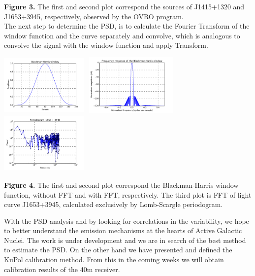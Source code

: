 \documentclass[a0paper,portrait]{baposter}
\begin{document}
\begin{poster}
{\begin{center}
\end{center}
\small{\textbf{Figure 3.} The first and second plot correspond the sources of J1415+1320 and J1653+3945, respectively, observed by the OVRO program.}\\
The next step to determine the PSD, is to calculate the Fourier Transform of the window function and the curve separately and convolve, which is analogous to convolve the signal with the window function and apply Transform.
\begin{center}
\includegraphics [height=30mm, width=43mm] {BH.pdf}
\hspace{.3cm}
\includegraphics [height=30mm, width=48mm] {FFTBH.pdf}
\hspace{.3cm}
\includegraphics [height=30mm, width=43mm] {FFTcurva_2.pdf}
\end{center}
\small{\textbf{Figure 4.} The first and second plot correspond the  Blackman-Harris window function, without FFT and with FFT, respectively. The third plot is FFT of light curve J1653+3945, calculated exclusively by Lomb-Scargle periodogram.}
}

{\small{ With the PSD analysis and by looking for correlations in the variability, we hope to better understand the emission mechanisms at the hearts of Active Galactic Nuclei. The work is under development and we are in search of the best method to estimate the PSD. On the other hand we have presented and defined the KuPol calibration method. From this in the coming weeks we will obtain calibration results of the 40m receiver. }
}


\end{poster}
\end{document}
